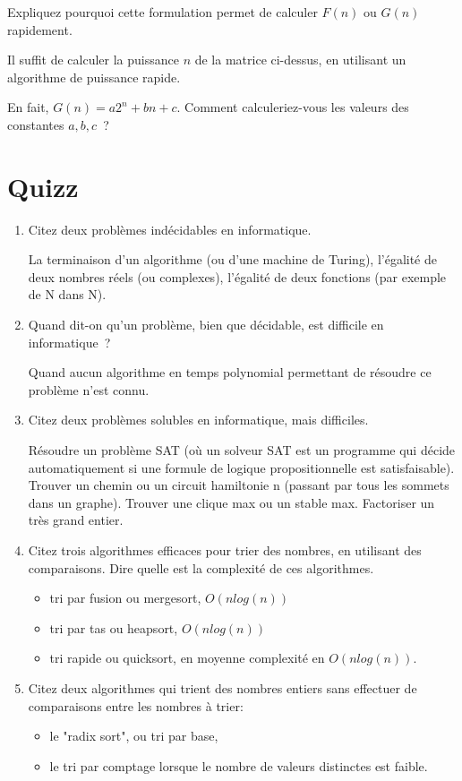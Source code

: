 \documentclass[11pt]{article}
\begin{document}
Expliquez pourquoi cette formulation permet de calculer $F(n)$ ou $G(n)$ rapidement.

Il suffit de calculer la puissance $n$ de la matrice ci-dessus, en utilisant un algorithme de puissance rapide.

En fait, $G(n)=a 2^n +b n + c$. Comment calculeriez-vous
les valeurs des constantes $a, b, c$~?



\section{Quizz}

\begin{enumerate}
\item Citez deux problèmes indécidables en informatique.

La terminaison d’un algorithme (ou d’une
machine de Turing), l’égalité de deux nombres réels (ou complexes), l’égalité de deux fonctions (par
exemple de N dans N).

\item  Quand dit-on qu'un problème, bien que décidable, est difficile en informatique~?

Quand aucun algorithme en temps polynomial permettant de résoudre
ce problème n’est connu.

\item   Citez deux problèmes solubles en informatique, mais difficiles.

Résoudre un problème SAT (où un solveur SAT est un programme qui
décide automatiquement si une formule de logique propositionnelle est
satisfaisable). Trouver un chemin ou un circuit hamiltonie n (passant
par tous les sommets dans un graphe). Trouver une clique max ou un
stable max. Factoriser un très grand entier.

\item   Citez  trois algorithmes efficaces pour trier des nombres, en utilisant des comparaisons. Dire quelle est la complexité de ces algorithmes.

\begin{itemize}
\item tri par fusion  ou mergesort, $O(n  log(n))$
\item tri par tas  ou heapsort, $O(n  log(n))$
\item  tri rapide ou quicksort, en moyenne complexité en $O(n  log(n))$.
\end{itemize}

\item  Citez deux  algorithmes  qui trient des nombres entiers sans effectuer de comparaisons entre les nombres à trier:
\begin{itemize}
\item  le "radix sort", ou tri par base,
\item le tri par comptage lorsque le nombre de valeurs distinctes est faible.
\end{itemize}


\end{enumerate}
\end{document}
